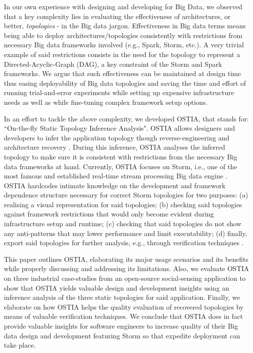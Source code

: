 In our own experience with designing and developing for Big Data, we observed that a key complexity lies in evaluating the effectiveness of architectures, or better, \emph{topologies} - in the Big data jargon. Effectiveness in Big data terms means being able to deploy architectures/topologies consistently with restrictions from necessary Big data frameworks involved (e.g., Spark, Storm, etc.). A very trivial example of said restrictions consists in the need for the topology to represent a Directed-Acyclic-Graph (DAG), a key constraint of the Storm and Spark frameworks.
We argue that such effectiveness can be maintained at design time thus easing deployability of Big data topologies and saving the time and effort of running trial-and-error experiments while setting up expensive infrastructure needs as well as while fine-tuning complex framework setup options.

In an effort to tackle the above complexity, we developed OSTIA, that stands for: ``On-the-fly Static Topology Inference Analysis". OSTIA allows designers and developers to infer the application topology though reverse-engineering and architecture recovery \cite{archrec}. During this inference, OSTIA analyses the inferred topology to make sure it is consistent with restrictions from the necessary Big data frameworks at hand. Currently, OSTIA focuses on Storm, i.e., one of the most famous and established real-time stream processing Big data engine \cite{storm}. OSTIA hardcodes intimate knowledge on the development and framework dependence structure necessary for correct Storm topologies for two purposes: (a) realising a visual representation for said topologies; (b) checking said topologies against framework restrictions that would only become evident during infrastructure setup and runtime; (c) checking that said topologies do not show any anti-patterns \cite{patternoriented2000} that may lower performance and limit executability; (d) finally, export said topologies for further analysis, e.g., through verification techniques \cite{icsoft}.

This paper outlines OSTIA, elaborating its major usage scenarios and its benefits while properly discussing and addressing its limitations. Also, we evaluate OSTIA on three industrial case-studies from an open-source social-sensing application to show that OSTIA yields valuable design and development insights using an inference analysis of the three static topologies for said application. Finally, we elaborate on how OSTIA helps the quality evaluation of recovered topologies by means of valuable verification techniques. We conclude that OSTIA does in fact provide valuable insights for software engineers to increase quality of their Big data design and development featuring Storm so that expedite deployment can take place.

